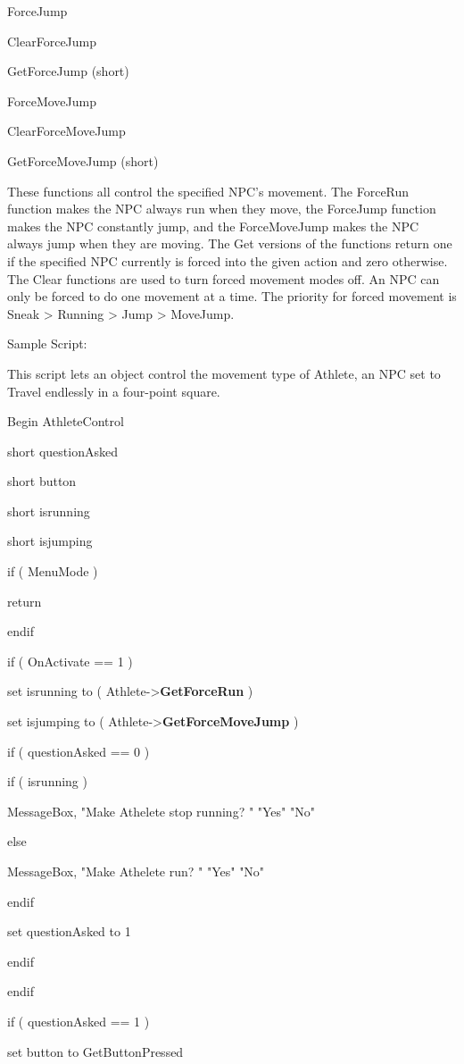 \documentclass[
]{article}
\begin{document}
ForceJump

ClearForceJump

GetForceJump (short)

ForceMoveJump

ClearForceMoveJump

GetForceMoveJump (short)

These functions all control the specified NPC's movement. The ForceRun
function makes the NPC always run when they move, the ForceJump function
makes the NPC constantly jump, and the ForceMoveJump makes the NPC
always jump when they are moving. The Get versions of the functions
return one if the specified NPC currently is forced into the given
action and zero otherwise. The Clear functions are used to turn forced
movement modes off. An NPC can only be forced to do one movement at a
time. The priority for forced movement is Sneak \textgreater{} Running
\textgreater{} Jump \textgreater{} MoveJump.

Sample Script:

This script lets an object control the movement type of Athlete, an NPC
set to Travel endlessly in a four-point square.

Begin AthleteControl

short questionAsked

short button

short isrunning

short isjumping

if ( MenuMode )

return

endif

if ( OnActivate == 1 )

set isrunning to ( Athlete-\textgreater{}\textbf{GetForceRun} )

set isjumping to ( Athlete-\textgreater{}\textbf{GetForceMoveJump} )

if ( questionAsked == 0 )

if ( isrunning )

MessageBox, "Make Athelete stop running? " "Yes" "No"

else

MessageBox, "Make Athelete run? " "Yes" "No"

endif

set questionAsked to 1

endif

endif

if ( questionAsked == 1 )

set button to GetButtonPressed
\end{document}
